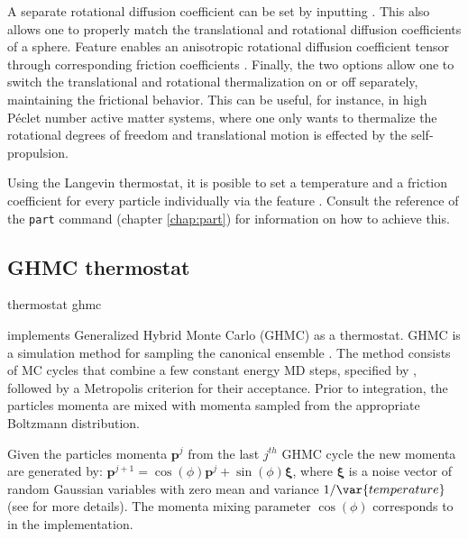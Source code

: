 A separate rotational diffusion coefficient can be set by inputting . This also allows one to properly match the translational and rotational diffusion coefficients of a sphere.
Feature  enables an anisotropic rotational diffusion coefficient tensor through corresponding friction coefficients   .
Finally, the two options  allow one to switch the translational and rotational thermalization on or off separately, maintaining the frictional behavior. This can be useful, for instance, in high P{\'e}clet number active matter systems, where one only wants to thermalize the rotational degrees of freedom and translational motion is effected by the self-propulsion.

Using the Langevin thermostat, it is posible to set a temperature and
a friction coefficient for every particle individually via the feature
. Consult the reference of the
\texttt{part} command (chapter \ref{chap:part}) for information on how
to achieve this.


\subsection{GHMC thermostat}

\begin{essyntax}
  thermostat ghmc     
\end{essyntax}

\es implements Generalized Hybrid Monte Carlo (GHMC) as a thermostat. GHMC is a
simulation method for sampling the canonical ensemble \cite{mehlig92}. The
method consists of MC cycles that combine a few constant energy MD steps,
specified by , followed by a Metropolis criterion for their
acceptance. Prior to integration, the particles momenta are mixed with momenta
sampled from the appropriate Boltzmann distribution. 

Given the particles momenta $\mathbf{p}^j$ from the last $j^{th}$
GHMC cycle the new momenta are generated
by: $\mathbf{p}^{j+1}=\cos(\phi)\mathbf{p}^j+\sin(\phi)\pmb{\xi}$, where
$\pmb{\xi}$ is a noise vector of random Gaussian variables with zero mean
and variance $1/\var{temperature}$ (see 
\cite{horowitz91} for more details). The
momenta mixing parameter $\cos(\phi)$ corresponds to  in the
implementation.

